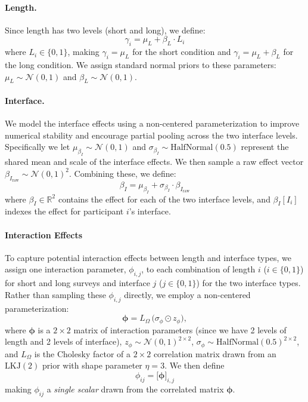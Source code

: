 \paragraph{Length.} Since length has two levels (short and long), we define:
\begin{equation}
    \gamma_i = \mu_L + \beta_L \cdot L_i 
    \label{eq:distance_model_1_eta_ordinal}
\end{equation}
where $L_i \in \{0,1\}$, making $\gamma_i = \mu_L$ for the short condition and $\gamma_i = \mu_L + \beta_L$ for the long condition. We assign standard normal priors to these parameters: $\mu_L \sim \mathcal{N}(0,1)$ and $\beta_L \sim \mathcal{N}(0,1)$. 

\paragraph{Interface.}
We model the interface effects using a non-centered parameterization to improve numerical stability and encourage partial pooling across the two interface levels. Specifically we let $\mu_{\beta_I} \sim \mathcal{N}(0,1)$ and $\sigma_{\beta_I} \sim \mathrm{HalfNormal}(0.5)$ represent the shared mean and scale of the interface effects. We then sample a raw effect vector $\beta_{I_{\text{raw}}} \sim \mathcal{N}(0,1)^2.$ Combining these, we define:
\begin{equation}
    \beta_I = \mu_{\beta_I} + \sigma_{\beta_I} \cdot \beta_{I_{\text{raw}}}
    \label{eq:interface_reparam}
\end{equation}
where $\beta_I \in \mathbb{R}^2$ contains the effect for each of the two interface levels, 
and $\beta_I[I_i]$ indexes the effect for participant $i$'s interface. 

\paragraph{Interaction Effects} To capture potential interaction effects between length and interface types, we assign one interaction parameter, $\phi_{i,j}$, to each combination of length $i$ ($i \in \{0,1\}$) for short and long surveys and interface $j$ ($j \in \{0,1\}$) for the two interface types. Rather than sampling these $\phi_{i,j}$ directly, we employ a non-centered parameterization:
\[
  \boldsymbol{\phi} = L_{\Omega} \,\bigl(\sigma_{\phi} \odot z_{\phi}\bigr),
\]
where \(\boldsymbol{\phi}\) is a $2 \times 2$ matrix of interaction parameters (since we have 2 levels of length and 2 levels of interface), $z_{\phi} \sim \mathcal{N}(0,1)^{2\times2}$, $\sigma_{\phi} \sim \text{HalfNormal}(0.5)^{2\times2}$, and $L_{\Omega}$ is the Cholesky factor of a $2\times2$ correlation matrix drawn from an $\text{LKJ}(2)$ prior with shape parameter $\eta=3$. We then define
\begin{equation}
    \phi_{ij} = \bigl[\boldsymbol{\phi}\bigr]_{i,j}
\end{equation}
making $\phi_{ij}$ a \emph{single scalar} drawn from the correlated matrix $\boldsymbol{\phi}$.

